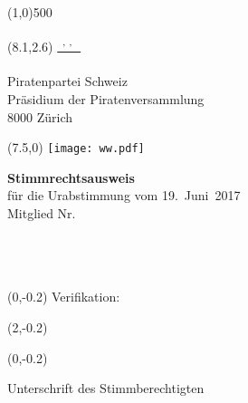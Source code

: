 \documentclass[11pt, a4paper]{scrartcl}
\begin{document}
{\begin{minipage}[t][13.42cm][t]{\textwidth}
\end{minipage}

\line(1,0){500}
\vspace{1cm}

\begin{minipage}[t][12.5cm][t]{\textwidth}

\begin{textblock}{9}(8.1,2.6)
\underline{\textsuperscript*{ \givenname~\surname, \street, \postalcode~\location }} \\
\vspace{-0.3cm} \\
Piratenpartei Schweiz \\
Präsidium der Piratenversammlung \\
8000 Zürich
\end{textblock}

\begin{textblock}{6}(7.5,0)
\texttt{[image: ww.pdf]}
\end{textblock}

{\LARGE\textbf{Stimmrechtsausweis}} \\
für die Urabstimmung vom 19.~Juni~2017 \\

Mitglied Nr. \textbf{\id}   \\
\givenname~\surname         \\
\street                     \\
\postalcode~\location       \\
%

\begin{textblock}{6}(0,-0.2)
Verifikation:
\end{textblock}

\begin{textblock}{4}(2,-0.2)
\raggedright
\code
\end{textblock}

\vspace{4cm}

\begin{textblock}{6}(0,-0.2)
\begin{framed}
Unterschrift des Stimmberechtigten \\
\vspace{1.5cm} ~ \\
\end{framed}
\end{textblock}


\end{minipage}}
\end{document}
